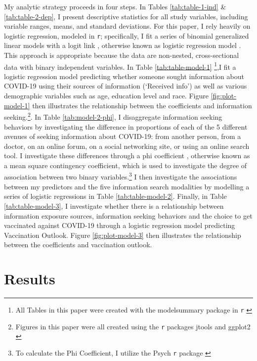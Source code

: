 My analytic strategy proceeds in four steps. In Tables \ref{tab:table-1-ind} \&
\ref{tab:table-2-dep}, I present descriptive statistics for all study variables,
including variable ranges, means, and standard deviations. For this paper, I
rely heavily on logistic regression, modeled in \texttt{r}; specifically, I fit
a series of binomial generalized linear models with a logit link
\citep{venables2002a}, otherwise known as logistic regression model
\citep{hothorn2006handbook}. This approach is appropriate because the data are
non-nested, cross-sectional data with binary independent variables. In Table
\ref{tab:table-model-1} \footnote{All Tables in this paper were created with the
modelsummary package in \texttt{r} \citep{modelsummary}},I fit a logistic
regression model predicting whether someone sought information about COVID-19
using their sources of information (`Received info') as well as various
demographic variables such as age, education level and race. Figure
\ref{fig:plot-model-1} then illustrates the relationship between the
coefficients and information seeking.\footnote{Figures in this paper were all
created using the \texttt{r} packages jtools \citep{jtools} and ggplot2
\citep{wickham_etal, wickham11}}. In Table \ref{tab:model-2-phi}, I disaggregate
information seeking behaviors by investigating the difference in proportions of
each of the 5 different avenues of seeking information about COVID-19: from
another person, from a doctor, on an online forum, on a social networking site,
or using an online search tool. I investigate these differences through a phi
coefficient \citep{warrens08}, otherwise known as a mean square contingency
coefficient, which is used to investigate the degree of association between two
binary variables.\footnote{To calculate the Phi Coefficient, I utilize the Psych
\texttt{r} package \citep{psych}} I then investigate the associations between my
predictors and the five information search modalities by modelling a series of
logistic regressions in Table \ref{tab:table-model-2}. Finally, in Table
\ref{tab:table-model-3}, I investigate whether there is a relationship between
information exposure sources, information seeking behaviors and the choice to
get vaccinated against COVID-19 through a logistic regression model predicting
Vaccination Outlook. Figure \ref{fig:plot-model-3} then illustrates the
relationship between the coefficients and vaccination outlook.

\hypertarget{results}{%
\section{Results}\label{results}}

